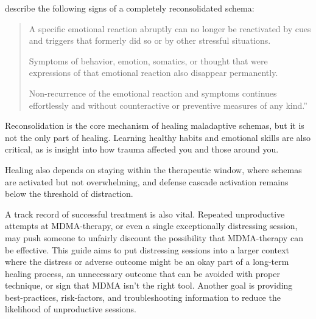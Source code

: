 \documentclass[12pt,letterpaper]{book}
\begin{document}
\textcite{eckerUnlocking} describe the following signs of a completely reconsolidated schema:
\begin{quotation}
    A specific emotional reaction abruptly can no longer be reactivated by cues and triggers that formerly did so or by other stressful situations.
    
    Symptoms of behavior, emotion, somatics, or thought that were expressions of that emotional reaction also disappear permanently.
    
    Non-recurrence of the emotional reaction and symptoms continues effortlessly and without counteractive or preventive measures of any kind.”
\end{quotation}

\vspace{\baselineskip}


Reconsolidation is the core mechanism of healing maladaptive schemas, but it is not the only part of healing. Learning healthy habits and emotional skills are also critical, as is insight into how trauma affected you and those around you.

Healing also depends on staying within the therapeutic window, where schemas are activated but not overwhelming, and defense cascade activation remains below the threshold of distraction.

A track record of successful treatment is also vital. Repeated unproductive attempts at MDMA-therapy, or even a single exceptionally distressing session, may push someone to unfairly discount the possibility that MDMA-therapy can be effective. This guide aims to put distressing sessions into a larger context where the distress or adverse outcome might be an okay part of a long-term healing process, an unnecessary outcome that can be avoided with proper technique, or sign that MDMA isn't the right tool. Another goal is providing best-practices, risk-factors, and troubleshooting information to reduce the likelihood of unproductive sessions.
\end{document}
